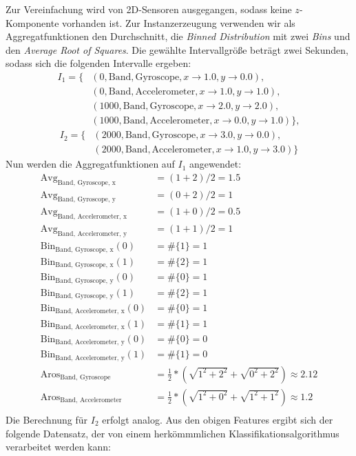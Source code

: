 Zur Vereinfachung wird von 2D-Sensoren ausgegangen, sodass keine $z$-Komponente vorhanden ist. Zur Instanzerzeugung verwenden wir als Aggregatfunktionen den Durchschnitt, die \textit{Binned Distribution} mit zwei \textit{Bins} und den \textit{Average Root of Squares}. Die gewählte Intervallgröße beträgt zwei Sekunden, sodass sich die folgenden Intervalle ergeben:
\begin{align*}
I_1 = \{&(0, \text{Band}, \text{Gyroscope}, {x \to 1.0, y \to 0.0}), \\
&(0, \text{Band}, \text{Accelerometer}, {x \to 1.0, y \to 1.0}), \\
&(1000, \text{Band}, \text{Gyroscope}, {x \to 2.0, y \to 2.0}), \\
&(1000, \text{Band}, \text{Accelerometer}, {x \to 0.0, y \to 1.0})\},
\end{align*}
\begin{align*}
I_2 = \{&(2000, \text{Band}, \text{Gyroscope}, {x \to 3.0, y \to 0.0}), \\
&(2000, \text{Band}, \text{Accelerometer}, {x \to 1.0, y \to 3.0})\}
\end{align*}
Nun werden die Aggregatfunktionen auf $I_1$ angewendet:
\begin{align*}
\text{Avg}_\text{Band, Gyroscope, x} &= (1 + 2)/2 = 1.5 \\
\text{Avg}_\text{Band, Gyroscope, y} &= (0 + 2)/2 = 1 \\
\text{Avg}_\text{Band, Accelerometer, x} &= (1 + 0)/2 = 0.5 \\
\text{Avg}_\text{Band, Accelerometer, y} &= (1 + 1)/2 = 1 \\
\text{Bin}_\text{Band, Gyroscope, x}(0) &= \#\{1\} = 1 \\
\text{Bin}_\text{Band, Gyroscope, x}(1) &= \#\{2\} = 1 \\
\text{Bin}_\text{Band, Gyroscope, y}(0) &= \#\{0\} = 1 \\
\text{Bin}_\text{Band, Gyroscope, y}(1) &= \#\{2\} = 1 \\
\text{Bin}_\text{Band, Accelerometer, x}(0) &= \#\{0\} = 1 \\
\text{Bin}_\text{Band, Accelerometer, x}(1) &= \#\{1\} = 1 \\
\text{Bin}_\text{Band, Accelerometer, y}(0) &= \#\{0\} = 0 \\
\text{Bin}_\text{Band, Accelerometer, y}(1) &= \#\{1\} = 0 \\
\text{Aros}_\text{Band, Gyroscope} &= \frac{1}{2} * (\sqrt{1^2 + 2^2} + \sqrt{0^2 + 2^2}) \approx 2.12 \\
\text{Aros}_\text{Band, Accelerometer} &= \frac{1}{2} * (\sqrt{1^2 + 0^2} + \sqrt{1^2 + 1^2}) \approx 1.2 \\
\end{align*}
Die Berechnung für $I_2$ erfolgt analog. Aus den obigen Features ergibt sich der folgende Datensatz, der von einem herkömmmlichen Klassifikationsalgorithmus verarbeitet werden kann:\\

